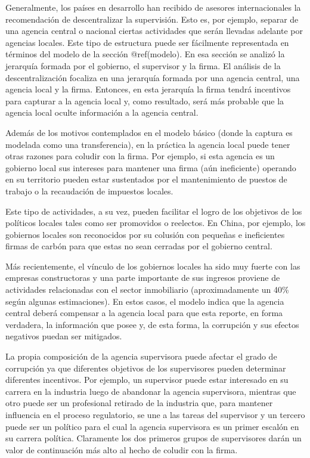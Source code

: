 \documentclass[
  12pt,
  spanish,
]{book}
\begin{document}
Generalmente, los países en desarrollo han recibido de asesores
internacionales la recomendación de descentralizar la supervisión. Esto
es, por ejemplo, separar de una agencia central o nacional ciertas
actividades que serán llevadas adelante por agencias locales. Este tipo
de estructura puede ser fácilmente representada en términos del modelo
de la sección @ref(modelo). En esa sección se analizó la jerarquía
formada por el gobierno, el supervisor y la firma. El análisis de la
descentralización focaliza en una jerarquía formada por una agencia
central, una agencia local y la firma. Entonces, en esta jerarquía la
firma tendrá incentivos para capturar a la agencia local y, como
resultado, será más probable que la agencia local oculte información a
la agencia central.

Además de los motivos contemplados en el modelo básico (donde la captura
es modelada como una transferencia), en la práctica la agencia local
puede tener otras razones para coludir con la firma. Por ejemplo, si
esta agencia es un gobierno local sus intereses para mantener una firma
(aún ineficiente) operando en su territorio pueden estar sustentados por
el mantenimiento de puestos de trabajo o la recaudación de impuestos
locales.

Este tipo de actividades, a su vez, pueden facilitar el logro de los
objetivos de los políticos locales tales como ser promovidos o
reelectos. En China, por ejemplo, los gobiernos locales son reconocidos
por su colusión con pequeñas e ineficientes firmas de carbón para que
estas no sean cerradas por el gobierno central.

Más recientemente, el vínculo de los gobiernos locales ha sido muy
fuerte con las empresas constructoras y una parte importante de sus
ingresos proviene de actividades relacionadas con el sector inmobiliario
(aproximadamente un 40\% según algunas estimaciones). En estos casos, el
modelo indica que la agencia central deberá compensar a la agencia local
para que esta reporte, en forma verdadera, la información que posee y,
de esta forma, la corrupción y sus efectos negativos puedan ser
mitigados.

La propia composición de la agencia supervisora puede afectar el grado
de corrupción ya que diferentes objetivos de los supervisores pueden
determinar diferentes incentivos. Por ejemplo, un supervisor puede estar
interesado en su carrera en la industria luego de abandonar la agencia
supervisora, mientras que otro puede ser un profesional retirado de la
industria que, para mantener influencia en el proceso regulatorio, se
une a las tareas del supervisor y un tercero puede ser un político para
el cual la agencia supervisora es un primer escalón en su carrera
política. Claramente los dos primeros grupos de supervisores darán un
valor de continuación más alto al hecho de coludir con la firma.
\end{document}
